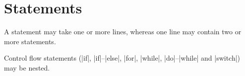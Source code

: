 \vfill\eject
{}%

\chapter{Statements}
 

A statement may take one or more lines, whereas one line may contain two or
more statements.

Control flow statements (|if|, |if|--|else|, |for|, |while|, |do|--|while|
and |switch|) may be nested.


